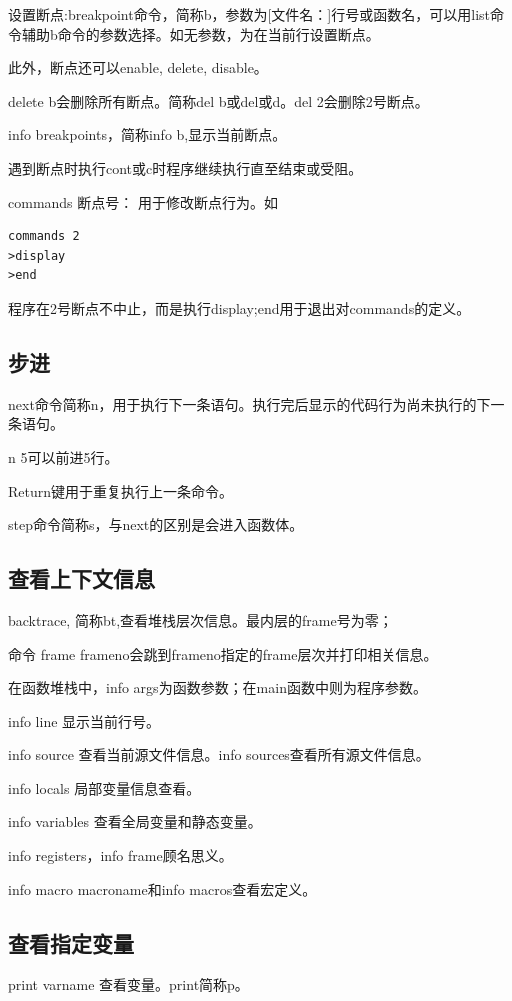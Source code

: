 设置断点:breakpoint命令，简称b，参数为[文件名：]行号或函数名，可以用list命令辅助b命令的参数选择。如无参数，为在当前行设置断点。

此外，断点还可以enable, delete, disable。

delete b会删除所有断点。简称del b或del或d。del 2会删除2号断点。

info breakpoints，简称info b,显示当前断点。

遇到断点时执行cont或c时程序继续执行直至结束或受阻。

commands 断点号：
用于修改断点行为。如 
\begin{verbatim}
commands 2
>display
>end
\end{verbatim}
程序在2号断点不中止，而是执行display;end用于退出对commands的定义。

\subsection{步进}
next命令简称n，用于执行下一条语句。执行完后显示的代码行为尚未执行的下一条语句。

n 5可以前进5行。

Return键用于重复执行上一条命令。

step命令简称s，与next的区别是会进入函数体。

\subsection{查看上下文信息}

backtrace, 简称bt,查看堆栈层次信息。最内层的frame号为零；

命令 frame frameno会跳到frameno指定的frame层次并打印相关信息。

在函数堆栈中，info args为函数参数；在main函数中则为程序参数。

info line 显示当前行号。

info source 查看当前源文件信息。info sources查看所有源文件信息。

info locals 局部变量信息查看。

info variables 查看全局变量和静态变量。

info registers，info frame顾名思义。

info macro macroname和info macros查看宏定义。


\subsection{查看指定变量}
print varname 查看变量。print简称p。

